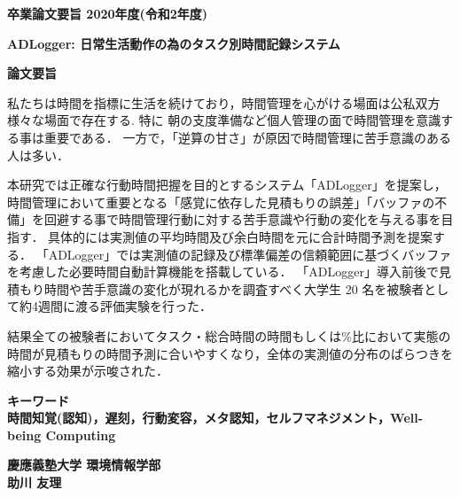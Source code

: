 \begin{center}
\textbf{\Large 卒業論文要旨 2020年度(令和2年度)}

\vspace{6.18mm}

\textbf{\Large ADLogger: 日常生活動作の為のタスク別時間記録システム}
\end{center}

\vspace{10mm}

\begin{flushleft}
\textbf{論文要旨}\\
\end{flushleft}
 私たちは時間を指標に生活を続けており，時間管理を心がける場面は公私双方様々な場面で存在する.
 特に 朝の支度準備など個人管理の面で時間管理を意識する事は重要である．
 一方で，「逆算の甘さ」が原因で時間管理に苦手意識のある人は多い．
 
本研究では正確な行動時間把握を目的とするシステム「ADLogger」を提案し，
時間管理において重要となる「感覚に依存した見積もりの誤差」「バッファの不備」を回避する事で時間管理行動に対する苦手意識や行動の変化を与える事を目指す．
具体的には実測値の平均時間及び余白時間を元に合計時間予測を提案する．
「ADLogger」では実測値の記録及び標準偏差の信頼範囲に基づくバッファを考慮した必要時間自動計算機能を搭載している．
「ADLogger」導入前後で見積もり時間や苦手意識の変化が現れるかを調査すべく大学生 20 名を被験者として約4週間に渡る評価実験を行った．

結果全ての被験者においてタスク・総合時間の時間もしくは\%比において実態の時間が見積もりの時間予測に合いやすくなり，全体の実測値の分布のばらつきを縮小する効果が示唆された．

\begin{flushleft}
\textbf{キーワード}\\
\textbf{時間知覚(認知)，遅刻，行動変容，メタ認知，セルフマネジメント，Well-being Computing}

\end{flushleft}

\begin{flushright}
\textbf{慶應義塾大学 環境情報学部}\\
\textbf{助川 友理}
\end{flushright}
\newpage

